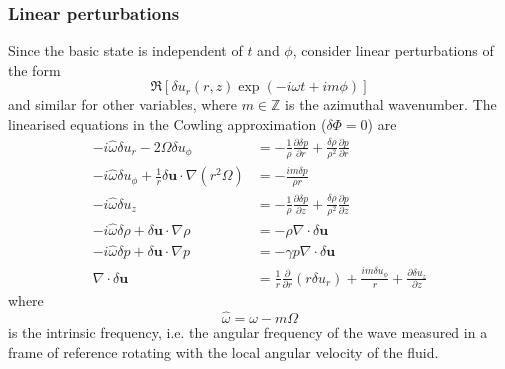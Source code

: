 \documentclass{jknotes}
\renewcommand{\u}{\symbf{u}}
\begin{document}
\subsubsection{Linear perturbations}
Since the basic state is independent of $t$ and $\phi$, consider linear
perturbations of the form
\begin{equation}
	\Re\left[\delta u_r(r,z) \exp(-i\omega t+ im\phi)\right]
\end{equation}
and similar for other variables, where $m \in \mathbb{Z}$ is the azimuthal
wavenumber. The linearised equations in the Cowling approximation ($\delta
\Phi = 0$) are
\begin{align}
	-i\hat{\omega}\delta u_r - 2\Omega \delta u_\phi &=
	-\frac{1}{\rho}\frac{\partial \delta p}{\partial r} + \frac{\delta
	\rho}{\rho^2} \frac{\partial p}{\partial r} \\
	-i\hat{\omega} \delta u_\phi + \frac{1}{r}\delta \u \cdot \nabla(r^2
	\Omega) &= -\frac{im\delta p}{\rho r} \\
	-i\hat{\omega}\delta u_z &= -\frac{1}{\rho}\frac{\partial \delta
	p}{\partial z} + \frac{\delta \rho}{\rho^2}\frac{\partial p}{\partial z}
	\\
	-i\hat{\omega} \delta \rho + \delta \u \cdot \nabla \rho &= -\rho
	\nabla \cdot \delta \u \\
	-i\hat{\omega}\delta p + \delta \u \cdot \nabla p &= -\gamma p \nabla \cdot \delta
	\u \\
	\nabla \cdot \delta \u &= \frac{1}{r}\frac{\partial}{\partial r}(r\delta
	u_r) + \frac{im\delta u_\phi}{r} + \frac{\partial \delta u_z}{\partial z}
\end{align}
where 
\begin{equation}
	\hat{\omega} = \omega - m\Omega
\end{equation}
is the intrinsic frequency, i.e. the angular frequency of the wave measured in
a frame of reference rotating with the local angular velocity of the fluid.
\end{document}
